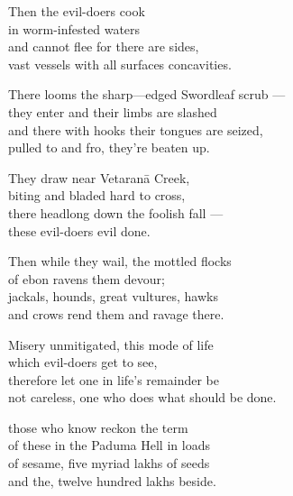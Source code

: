 \begin{MyDescription}{}
Then the evil-doers cook\\
in worm-infested waters\\
and cannot flee for there are sides,\\
vast vessels with all surfaces concavities.
\end{MyDescription} 

\begin{MyDescription}{}
There looms the sharp—edged Swordleaf scrub —\\
they enter and their limbs are slashed\\
and there with hooks their tongues are seized,\\
pulled to and fro, they're beaten up.
\end{MyDescription} 

\begin{MyDescription}{}
They draw near Vetaran\=a Creek,\\
biting and bladed hard to cross,\\
there headlong down the foolish fall —\\
these evil-doers evil done.
\end{MyDescription} 

\begin{MyDescription}{}
Then while they wail, the mottled flocks\\
of ebon ravens them devour;\\
jackals, hounds, great vultures, hawks\\
and crows rend them and ravage there.
\end{MyDescription} 

\begin{MyDescription}{}
Misery unmitigated, this mode of life\\
which evil-doers get to see,\\
therefore let one in life's remainder be\\
not careless, one who does what should be done.
\end{MyDescription} 

\begin{MyDescription}{}
those who know reckon the term\\
of these in the Paduma Hell in loads\\
of sesame, five myriad lakhs of seeds\\
and the, twelve hundred lakhs beside.
\end{MyDescription} 

